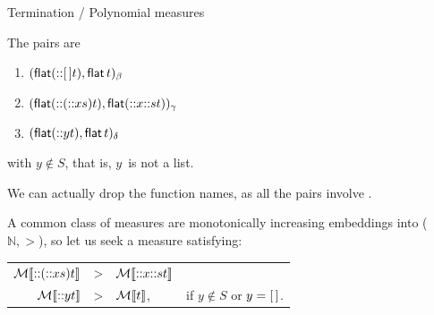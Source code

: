 %
\begin{frame}{Termination / Polynomial measures}

  The pairs are
  \begin{enumerate}

    \item \((\textsf{flat}(\textsf{::}{[\,]}{t}), \textsf{flat}\,t)_\beta\)

    \item \((\textsf{flat}(\textsf{::}{(\textsf{::}{x}{s})}{t}),
      \textsf{flat}(\textsf{::}{x}{\textsf{::}{s}{t}}))_\gamma\)

    \item \((\textsf{flat}(\textsf{::}{y}{t}), \textsf{flat}\,t)_\delta\)

  \end{enumerate}
  with \(y \not\in S\), that is, \(y\)~is not a list.

  \bigskip

  We can actually drop the function names, as all the pairs involve
  .

  \bigskip

  A common class of measures are monotonically increasing embeddings
  into (\(\mathbb{N},>\)), so let us seek a measure satisfying:
  \begin{center}
    \begin{tabular}{r@{\;\,}c@{\;}ll}
      \(\mathcal{M}\llbracket{\textsf{::}{(\textsf{::}{x}{s})}{t}}\rrbracket\) & > &
      \(\mathcal{M}\llbracket{\textsf{::}{x}{\textsf{::}{s}{t}}}\rrbracket\)\\
      \(\mathcal{M}\llbracket{\textsf{::}{y}{t}}\rrbracket\) & > & \(\mathcal{M}\llbracket{t}\rrbracket\),
      & if \(y \not\in S\) or \(y=[\,]\).
    \end{tabular}
  \end{center}

\end{frame}

